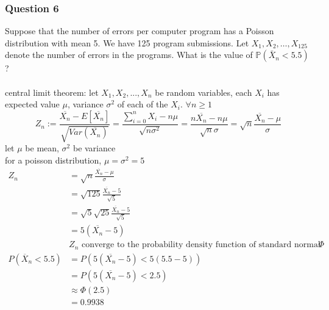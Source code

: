 \documentclass[12pt, border = 4pt, multi]{article} %
\begin{document}
\subsubsection*{Question 6}
Suppose that the number of errors per 
computer program has a Poisson 
distribution with mean 5. 
We have 125 program submissions. 
Let $X_1, X_2, \ldots, X_{125}$ 
denote the number of errors in the 
programs. What is the value of 
$\mathbb{P}(\bar{X}_n < 5.5)$?\\
\\
central limit theorem: let $X_1, X_2, ..., X_n$ be random variables, each $X_i$ has expected value $\mu$, variance $\sigma ^ 2$ of each of the $X_i$. $\forall n \geq 1$
\[Z_n := \frac{\overline{X_n} - E[\overline{X_n}]}{\sqrt{Var(\overline{X_n})}}
= \frac{\sum_{i = 0} ^ n X_i - n\mu}{\sqrt{n\sigma ^ 2}} = \frac{n\overline{X_n} - n\mu}{\sqrt{n}\sigma} = \sqrt{n}\frac{\overline{X_n} - \mu}{\sigma}\]
let $\mu$ be mean, $\sigma ^ 2$ be variance\\
for a poisson distribution, $\mu = \sigma ^ 2 = 5$
\begin{align*}
Z_n &= \sqrt{n}\frac{\overline{X_n} - \mu}{\sigma}\\
&= \sqrt{125}\frac{\overline{X_n} - 5}{\sqrt{5}}\\
&= \sqrt{5}\sqrt{25}\frac{\overline{X_n} - 5}{\sqrt{5}}\\
&= 5(\overline{X_n} - 5)\\
&Z_n \text{ converge to the probability density function of standard normal distribution } \Phi\\
P(\overline{X}_n < 5.5) &= P(5(\overline{X_n} - 5) < 5(5.5 - 5))\\
&= P(5(\overline{X_n} - 5) < 2.5)\\
&\approx \Phi(2.5)\\
&= \boxed{0.9938}
\end{align*}
\end{document}
